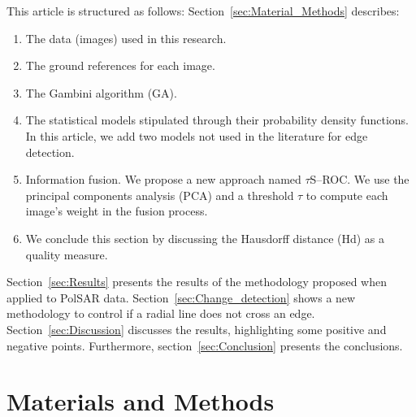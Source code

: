 \documentclass[remotesensing,article,submit,pdftex,moreauthors]{Definitions/mdpi}
\begin{document}
This article is structured as follows: Section~\eqref{sec:Material_Methods} describes:
\begin{enumerate}[label=(\roman*)]
\item \label{item:Material_Methods01} The data (images) used in this research.
\item \label{item:Material_Methods02} The ground references for each image.
\item \label{item:Material_Methods03} The Gambini algorithm (GA). 
\item \label{item:Material_Methods04} The statistical models stipulated through their probability density functions. In this article, we add two models not used in the literature for edge detection.  
\item \label{item:Material_Methods05} Information fusion. We propose a new approach named  $\tau$S--ROC. We use the principal components analysis (PCA) and a threshold $\tau$ to compute each image's weight in the fusion process. 
\item \label{item:Material_Methods06} We conclude this section by discussing the Hausdorff distance (Hd) as a quality measure. 
\end{enumerate}
Section~\eqref{sec:Results} presents the results of the methodology proposed when applied to PolSAR data. Section~\eqref{sec:Change_detection} shows a new methodology to control if a radial line does not cross an edge. 
Section~\eqref{sec:Discussion} discusses the results, highlighting some positive and negative points. Furthermore, section~\eqref{sec:Conclusion} presents the conclusions.


\section{Materials and Methods}\label{sec:Material_Methods}
%
\end{document}
